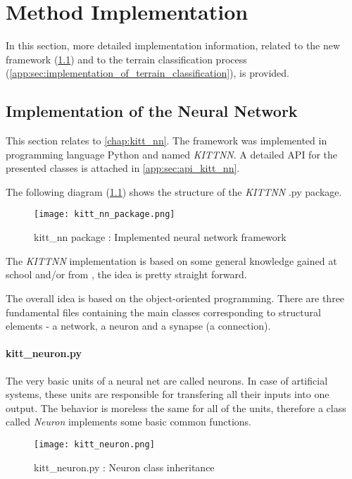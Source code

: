 \chapter{Method Implementation} \label{app:implementation_details}
In this section, more detailed implementation information, related to the new framework (\cref{app:sec:implementation_of_nn}) and to the terrain classification process (\cref{app:sec:implementation_of_terrain_classification}), is provided.

\section{Implementation of the Neural Network} \label{app:sec:implementation_of_nn}
This section relates to \cref{chap:kitt_nn}. The framework was implemented in programming language Python and named \textit{KITTNN}. A detailed API for the presented classes is attached in \cref{app:sec:api_kitt_nn}.

The following diagram (\ref{img:kitt_nn_package}) shows the structure of the \textit{KITTNN} .py package.

\begin{figure}[H]
  \centering
  \texttt{[image: kitt\_nn\_package.png]}
  \caption{kitt\_nn package : Implemented neural network framework}
  \label{img:kitt_nn_package}
\end{figure}

The \textit{KITTNN} implementation is based on some general knowledge gained at school and/or from \citep{online:nn_demystified}, the idea is pretty straight forward.

The overall idea is based on the object-oriented programming. There are three fundamental files containing the main classes corresponding to structural elements - a network, a neuron and a synapse (a connection).

\subsubsection*{kitt\_neuron.py} \label{ssec:kitt_neuron}
The very basic units of a neural net are called neurons. In case of artificial systems, these units are responsible for transfering all their inputs into one output. The behavior is moreless the same for all of the units, therefore a class called \textit{Neuron} implements some basic common functions.

\begin{figure}[H]
  \centering
  \texttt{[image: kitt\_neuron.png]}
  \caption{kitt\_neuron.py : Neuron class inheritance}
  \label{img:kitt_neuron}
\end{figure}

